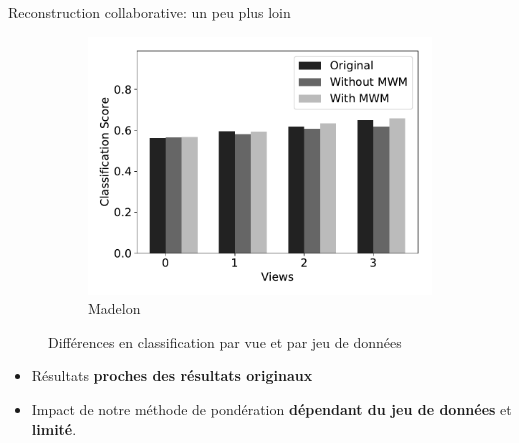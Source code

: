 \documentclass[hyperref={pdfpagelabels=false}]{beamer}
\begin{document}
\begin{frame}{Reconstruction collaborative: un peu plus loin}
\begin{figure}[!h]
\begin{subfigure}[c]{0.32\textwidth}
                \includegraphics[scale=.22]{cs_madelon}
                \caption{Madelon}
            \end{subfigure}
            \caption{Différences en classification par vue et par jeu de 
            données}
        \end{figure}
        \begin{itemize}
            \item Résultats \textbf{proches des résultats originaux}
            \item Impact de notre méthode de pondération \textbf{dépendant du 
                jeu de données} et \textbf{limité}.
        \end{itemize}
    \end{frame}
\end{document}
